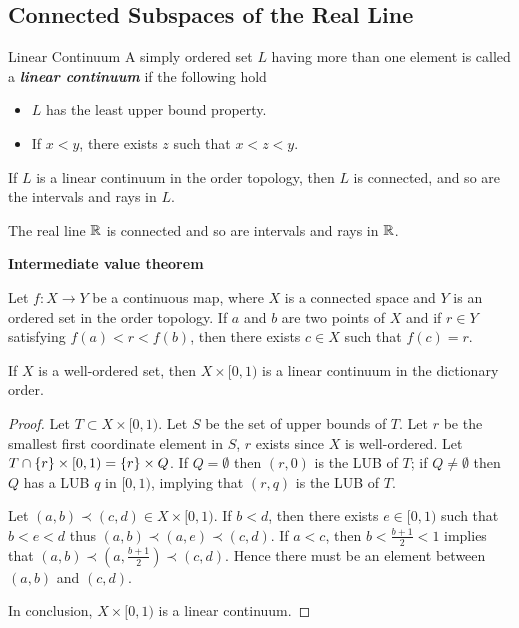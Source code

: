 \documentclass[12pt,a4paper]{article}
\begin{document}
    \subsection{Connected Subspaces of the Real Line}
    \begin{defi}{Linear Continuum}
        A simply ordered set $L$ having more than one element is called a \textbf{\textit{linear continuum}} if the following hold
        \begin{itemize}
            \item $L$ has the least upper bound property.
            \item If $x<y$, there exists $z$ such that $x<z<y$.
        \end{itemize}
    \end{defi}
    \hfill

    \begin{thm}
        If $L$ is a linear continuum in the order topology, then $L$ is connected, and so are the intervals and rays in $L$.
    \end{thm}
    
    \begin{cor}
        The real line $\mathbb{R}$ is connected and so are intervals and rays in $\mathbb{R}$.
    \end{cor}
    \hfill

    \begin{thm}\textbf{Intermediate value theorem}\hfill
    
        Let $f:X\to Y$ be a continuous map, where $X$ is a connected space and $Y$ is an ordered set in the order topology. If $a$ and $b$ are two points of $X$ and if $r\in Y$ satisfying $f(a)<r<f(b)$, then there exists $c\in X$ such that $f(c)=r$.
    \end{thm}
    \hfill

    \begin{ex}
        If $X$ is a well-ordered set, then $X\times [0,1)$ is a linear continuum in the dictionary order.
    \end{ex}
    \begin{proof}
        Let $T\subset X\times [0,1)$. Let $S$ be the set of upper bounds of $T$. Let $r$ be the smallest first coordinate element in $S$, $r$ exists since $X$ is well-ordered. Let $T\cap\left\{r\right\}\times[0,1)= \left\{r\right\}\times Q$. If $Q=\emptyset$ then $(r,0)$ is the LUB of $T$; if $Q\neq\emptyset$ then $Q$ has a LUB $q$ in $[0,1)$, implying that $(r,q)$ is the LUB of $T$.


        Let $(a,b)\prec(c,d)\in X\times [0,1)$. If $b<d$, then there exists $e\in [0,1)$ such that $b<e<d$ thus $(a,b)\prec(a,e)\prec(c,d)$. If $a<c$, then $b<\frac{b+1}{2}<1$ implies that $(a,b)\prec(a,\frac{b+1}{2})\prec(c,d)$. Hence there must be an element between $(a,b)$ and $(c,d)$.

        In conclusion, $X\times [0,1)$ is a linear continuum.
    \end{proof}
    \hfill
\end{document}
